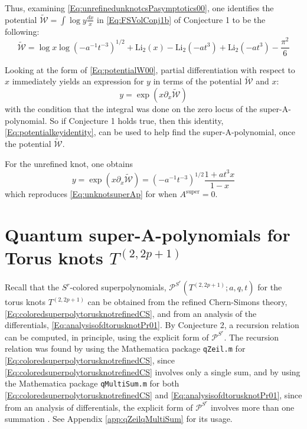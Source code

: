 \documentclass[a4paper,titlepage,twoside]{book}
\begin{document}

Thus, examining \eqref{Eq:unrefinedunknotcsPasymptotics00}, one identifies the potential $\widetilde{\mathcal{W}} = \int \log{y} \frac{dx}{x}$ in \eqref{Eq:FSVolConj1b} of Conjecture 1 to be the following:
\begin{equation}
  \widetilde{ \mathcal{W}} = \log{x} \log{ (-a^{-1} t^{-3})^{1/2} } + \text{Li}_2{(x)} - \text{Li}_2{ (-at^3)} + \text{Li}_2{ (-at^3)} - \frac{\pi^2}{6}
\end{equation}

Looking at the form of \eqref{Eq:potentialW00}, partial differentiation with respect to $x$ immediately yields an expression for $y$ in terms of the potential $\mathcal{\widetilde{W}}$ and $x$:
\begin{equation}
y = \exp{ \left( x \partial_x \widetilde{ \mathcal{W}} \right) } \label{Eq:potentialkeyidentity}
\end{equation}
with the condition that the integral was done on the zero locus of the super-A-polynomial.  So if Conjecture 1 holds true, then this identity, \eqref{Eq:potentialkeyidentity}, can be used to help find the super-A-polynomial, once the potential $\widetilde{\mathcal{W}}$.  

For the unrefined knot, one obtains
\begin{equation}
y = \exp{ \left( x \partial_x \widetilde{ \mathcal{W}} \right) } = (-a^{-1} t^{-3})^{1/2} \frac{1+ at^3 x}{ 1 - x}
\end{equation}
which reproduces \eqref{Eq:unknotsuperAp} for when $A^{\text{super}} =0$.  

\section{Quantum super-A-polynomials for Torus knots $T^{(2,2p+1)}$}

Recall that the $S^r$-colored superpolynomials, $\mathcal{P}^{S^r}{ (T^{ (2,2p+1)}; a,q,t) }$ for the torus knots $T^{(2,2p+1)}$ can be obtained from the refined Chern-Simons theory, \eqref{Eq:coloredsuperpolytorusknotrefinedCS}, and from an analysis of the differentials, \eqref{Eq:analysisofdtorusknotPr01}.  By Conjecture 2, a recursion relation can be computed, in principle, using the explicit form of $\mathcal{P}^{S^r}$.  The recursion relation was found by using the Mathematica package \texttt{qZeil.m} for \eqref{Eq:coloredsuperpolytorusknotrefinedCS}, since \eqref{Eq:coloredsuperpolytorusknotrefinedCS} involves only a single sum, and by using the Mathematica package \texttt{qMultiSum.m} for both \eqref{Eq:coloredsuperpolytorusknotrefinedCS} and \eqref{Eq:analysisofdtorusknotPr01}, since from an analysis of differentials, the explicit form of $\mathcal{P}^{S^r}$ involves more than one summation \cite{RieseqZeil}.  See Appendix \ref{app:qZeilqMultiSum} for its usage.   
\end{document}
